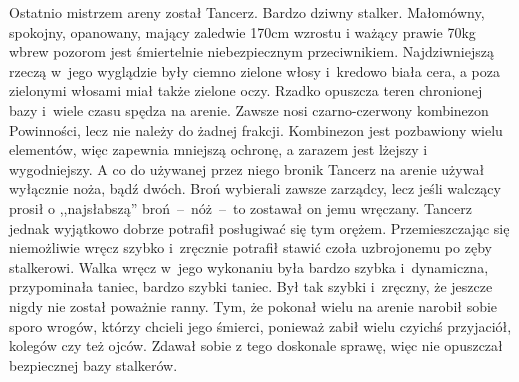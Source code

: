 \documentclass[../MAIN.tex]{subfiles}
\begin{document}
Ostatnio mistrzem areny został Tancerz. Bardzo dziwny stalker.
Małomówny, spokojny, opanowany, mający zaledwie 170cm wzrostu i
ważący prawie 70kg wbrew pozorom jest śmiertelnie
niebezpiecznym przeciwnikiem. Najdziwniejszą rzeczą w~jego
wyglądzie były ciemno zielone włosy i~kredowo biała cera, a
poza zielonymi włosami miał także zielone oczy. Rzadko opuszcza
teren chronionej bazy i~wiele czasu spędza na arenie. Zawsze
nosi czarno-czerwony kombinezon Powinności, lecz nie należy do
żadnej frakcji. Kombinezon jest pozbawiony wielu elementów,
więc zapewnia mniejszą ochronę, a zarazem jest lżejszy i
wygodniejszy. A co do używanej przez niego broni\3k Tancerz na
arenie używał wyłącznie noża, bądź dwóch. Broń wybierali zawsze
zarządcy, lecz jeśli walczący prosił o ,,najsłabszą''
broń~--~nóż~--~to zostawał on jemu wręczany. Tancerz jednak
wyjątkowo dobrze potrafił posługiwać się tym orężem.
Przemieszczając się niemożliwie wręcz szybko i~zręcznie
potrafił stawić czoła
uzbrojonemu po zęby stalkerowi. Walka wręcz w~jego wykonaniu
była bardzo szybka i~dynamiczna, przypominała taniec, bardzo
szybki taniec. Był tak szybki i~zręczny, że jeszcze nigdy nie
został poważnie ranny. Tym, że pokonał wielu na arenie narobił
sobie sporo wrogów, którzy chcieli jego śmierci, ponieważ zabił
wielu czyichś przyjaciół, kolegów czy też ojców. Zdawał sobie z
tego doskonale sprawę, więc nie opuszczał bezpiecznej bazy
stalkerów.
\end{document}
